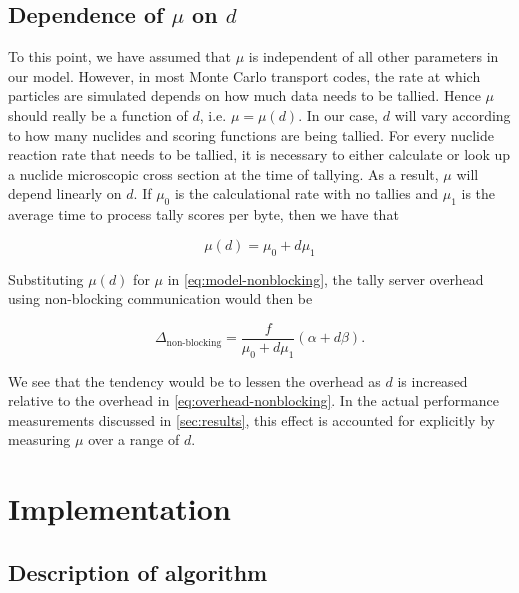 \documentclass[3p,fleqn]{elsarticle}
\begin{document}
\subsection{Dependence of \texorpdfstring{$\mu$ on $d$}{u on d}}

To this point, we have assumed that $\mu$ is independent of all other parameters
in our model. However, in most Monte Carlo transport codes, the rate at which
particles are simulated depends on how much data needs to be tallied. Hence
$\mu$ should really be a function of $d$, i.e. $\mu = \mu(d)$. In our case, $d$
will vary according to how many nuclides and scoring functions are being
tallied. For every nuclide reaction rate that needs to be tallied, it is
necessary to either calculate or look up a nuclide microscopic cross section at
the time of tallying. As a result, $\mu$ will depend linearly on $d$. If $\mu_0$
is the calculational rate with no tallies and $\mu_1$ is the average time to
process tally scores per byte, then we have that

\begin{equation}
  \label{eq:mu-function}
  \mu(d) = \mu_0 + d\mu_1
\end{equation}

\noindent Substituting $\mu(d)$ for $\mu$ in \eqref{eq:model-nonblocking}, the
tally server overhead using non-blocking communication would then be

\begin{equation}
  \label{eq:model-blocking-mud}
  \Delta_{\text{non-blocking}} = \frac{f}{\mu_0 + d\mu_1} \left ( \alpha + d\beta
    \right ).
\end{equation}

\noindent We see that the tendency would be to lessen the overhead as $d$ is
increased relative to the overhead in \eqref{eq:overhead-nonblocking}. In the
actual performance measurements discussed in \autoref{sec:results}, this effect
is accounted for explicitly by measuring $\mu$ over a range of $d$.

\section{Implementation}
\label{sec:implementation}

\subsection{Description of algorithm}
\end{document}
